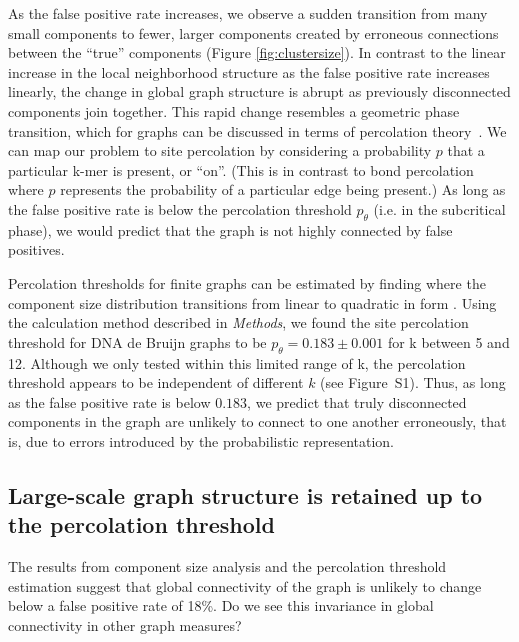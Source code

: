 \documentclass{pnastwo}
\begin{document}
\begin{article}
As the false positive rate increases, we observe a sudden transition
from many small components to fewer, larger components created by
erroneous connections between the ``true'' components (Figure
\ref{fig:clustersize}).  In contrast to the linear increase in the
local neighborhood structure as the false positive rate increases
linearly, the change in global graph structure is abrupt as previously
disconnected components join together.  This rapid change resembles a
geometric phase transition, which for graphs can be discussed in terms
of percolation theory~\cite{staufferintro}. We can map our problem to
site percolation by considering a probability $p$ that a particular
k-mer is present, or ``on''. (This is in contrast to bond percolation
where $p$ represents the probability of a particular edge being
present.) As long as the false positive rate is below the percolation
threshold $p_\theta$ (i.e. in the subcritical phase), we would predict
that the graph is not highly connected by false positives.


Percolation thresholds for finite graphs can be estimated by finding
where the component size distribution transitions from linear to
quadratic in form \cite{stauffer1979scaling}.  Using the calculation
method described in \emph{Methods}, we found the site percolation
threshold for DNA de Bruijn graphs to be $p_\theta = 0.183 \pm 0.001$
for k between 5 and 12.  Although we only tested within this limited
range of k, the percolation threshold appears to be independent of
different $k$ (see Figure~S1).  Thus, as long as the false positive
rate is below $0.183$, we predict that truly disconnected components
in the graph are unlikely to connect to one another erroneously, that
is, due to errors introduced by the probabilistic representation.

\subsection{Large-scale graph structure is retained up to the percolation threshold}

The results from component size analysis and the percolation threshold
estimation suggest that global connectivity of the graph is unlikely
to change below a false positive rate of 18\%.  Do we see this invariance
in global connectivity in other graph measures?


\end{article}
\end{document}
